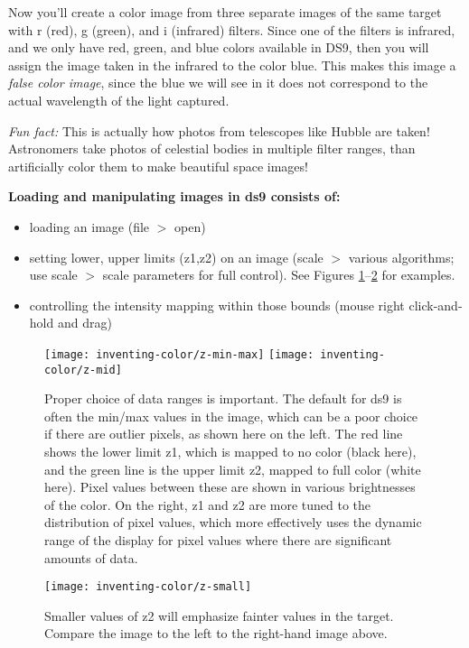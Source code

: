 Now you'll create a color image from three separate images of the same target with r (red), g (green), and i (infrared) filters. Since one of the filters is infrared, and we only have red, green, and blue colors available in DS9, then you will assign the image taken in the infrared to the color blue. This makes this image a \textit{false color image}, since the blue we will see in it does not correspond to the actual wavelength of the light captured.

\begin{framed}
	\emph{Fun fact:}
	This is actually how photos from telescopes like Hubble are taken! Astronomers
	take photos of celestial bodies in multiple filter ranges, than artificially
	color them to make beautiful space images!
\end{framed}


\textbf{Loading and manipulating images in ds9 consists of:}
\begin{itemize}
\item loading an image  (file $>$ open)
\item setting lower, upper limits (z1,z2) on an image  (scale $>$ various algorithms; use scale $>$ scale parameters for full control). See Figures \ref{ic:fig:z-min-max}--\ref{ic:fig:z-small} for examples.
\item controlling the intensity mapping within those bounds (mouse right click-and-hold and drag)
\end{itemize}

\begin{figure}
	\texttt{[image: inventing-color/z-min-max]}
	\texttt{[image: inventing-color/z-mid]}
	\caption{Proper choice of data ranges is important. The default for ds9 is often the min/max values in the image, which can be a poor choice if there are outlier pixels, as shown here on the left. The red line shows the lower limit z1, which is mapped to no color (black here), and the green line is the upper limit z2, mapped to full color (white here). Pixel values between these are shown in various brightnesses of the color. On the right, z1 and z2 are more tuned to the distribution of pixel values, which more effectively uses the dynamic range of the display for pixel values where there are significant amounts of data.}\label{ic:fig:z-min-max}
\end{figure}

\begin{figure}
		\texttt{[image: inventing-color/z-small]}
		\caption{Smaller values of z2 will emphasize fainter values in the target. Compare the image to the left to the right-hand image above.}\label{ic:fig:z-small}
\end{figure}


